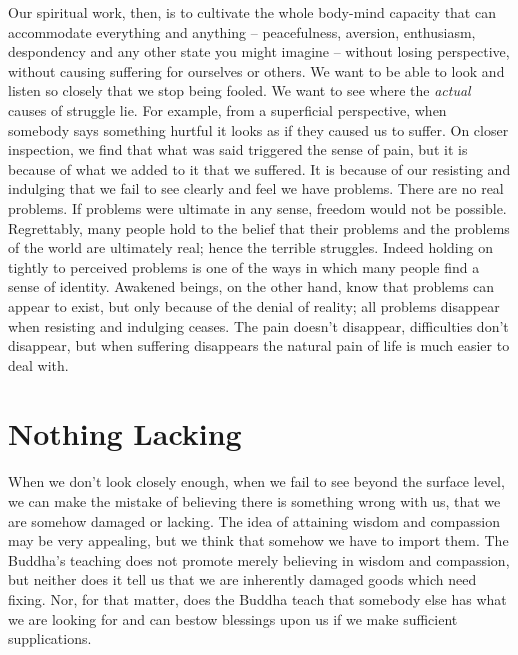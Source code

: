 \enlargethispage*{\baselineskip}

Our spiritual work, then, is to cultivate the whole body-mind capacity
that can accommodate everything and anything – peacefulness, aversion,
enthusiasm, despondency and any other state you might imagine – without
losing perspective, without causing suffering for ourselves or others.
We want to be able to look and listen so closely that we stop being
fooled. We want to see where the \emph{actual} causes of struggle lie. For
example, from a superficial perspective, when somebody says something
hurtful it looks as if they caused us to suffer. On closer inspection,
we find that what was said triggered the sense of pain, but it is
because of what we added to it that we suffered. It is because of our
resisting and indulging that we fail to see clearly and feel we have
problems. There are no real problems. If problems were ultimate in any
sense, freedom would not be possible. Regrettably, many people hold to
the belief that their problems and the problems of the world are
ultimately real; hence the terrible struggles. Indeed holding on tightly
to perceived problems is one of the ways in which many people find a
sense of identity. Awakened beings, on the other hand, know that
problems can appear to exist, but only because of the denial of reality;
all problems disappear when resisting and indulging ceases. The pain
doesn’t disappear, difficulties don’t disappear, but when suffering
disappears the natural pain of life is much easier to deal with.

\section{Nothing Lacking}

When we don’t look closely enough, when we fail to see beyond the
surface level, we can make the mistake of believing there is something
wrong with us, that we are somehow damaged or lacking. The idea of
attaining wisdom and compassion may be very appealing, but we think that
somehow we have to import them. The Buddha’s teaching does not promote
merely believing in wisdom and compassion, but neither does it tell us
that we are inherently damaged goods which need fixing. Nor, for that
matter, does the Buddha teach that somebody else has what we are looking
for and can bestow blessings upon us if we make sufficient
supplications.

